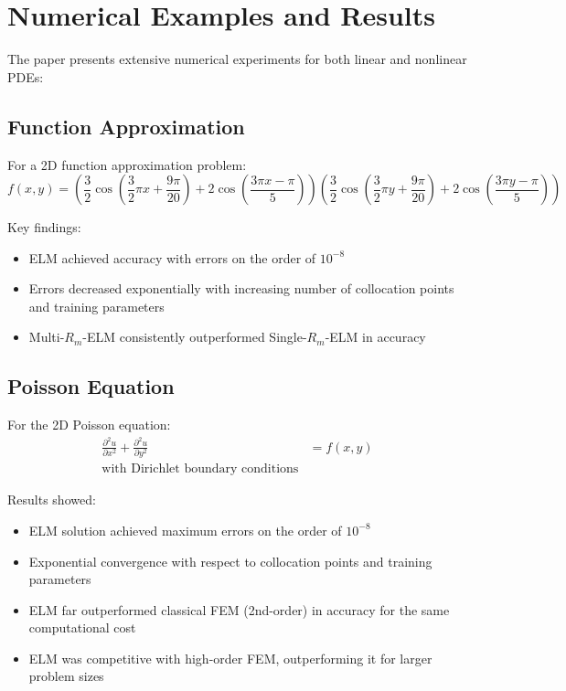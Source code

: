 \documentclass[11pt,a4paper]{article}
\begin{document}
\section{Numerical Examples and Results}

The paper presents extensive numerical experiments for both linear and nonlinear PDEs:

\subsection{Function Approximation}

For a 2D function approximation problem:
\begin{equation}
    f(x,y) = \left(\frac{3}{2}\cos\left(\frac{3}{2}\pi x+\frac{9\pi}{20}\right) + 2\cos\left(\frac{3\pi x-\pi}{5}\right)\right)\left(\frac{3}{2}\cos\left(\frac{3}{2}\pi y+\frac{9\pi}{20}\right) + 2\cos\left(\frac{3\pi y-\pi}{5}\right)\right)
\end{equation}

Key findings:
\begin{itemize}
    \item ELM achieved accuracy with errors on the order of $10^{-8}$
    \item Errors decreased exponentially with increasing number of collocation points and training parameters
    \item Multi-$R_m$-ELM consistently outperformed Single-$R_m$-ELM in accuracy
\end{itemize}

\subsection{Poisson Equation}

For the 2D Poisson equation:
\begin{align}
    \frac{\partial^2 u}{\partial x^2} + \frac{\partial^2 u}{\partial y^2} &= f(x,y) \\
    \text{with Dirichlet boundary conditions}
\end{align}

Results showed:
\begin{itemize}
    \item ELM solution achieved maximum errors on the order of $10^{-8}$
    \item Exponential convergence with respect to collocation points and training parameters
    \item ELM far outperformed classical FEM (2nd-order) in accuracy for the same computational cost
    \item ELM was competitive with high-order FEM, outperforming it for larger problem sizes
\end{itemize}
\end{document}
